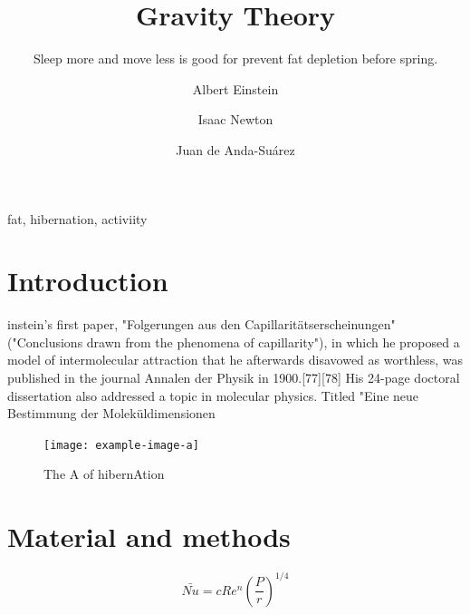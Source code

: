 \documentclass{SFEE}
\begin{document}
\twocolumn

\title{Gravity Theory}
\subtitle{Sleep more and move less is good for prevent fat depletion before   spring.}
\author[1,*]{Albert Einstein }
\author[2]{Isaac Newton}
\author[3]{Juan de Anda-Suárez }
\maketitle
\begin{abstract}
    \lipsum[5]
\end{abstract}
\begin{keywords}
    fat, hibernation, activiity
\end{keywords}

\section{Introduction}

instein's first paper, "Folgerungen aus den Capillaritätserscheinungen" ("Conclusions drawn from the phenomena of capillarity"), in which he proposed a model of intermolecular attraction that he afterwards disavowed as worthless, was published in the journal Annalen der Physik in 1900.[77][78] His 24-page doctoral dissertation also addressed a topic in molecular physics. Titled "Eine neue Bestimmung der Moleküldimensionen \cite{1908JRE.....4..411E}

\begin{figure}[b!]
\texttt{[image: example-image-a]}
\caption{The A of hibernAtion}
\end{figure}
\lipsum[10-13]
\section{Material and methods}
\lipsum[14-17]
\begin{equation}
 \bar{Nu}=cRe^{n}\left ( \frac{P}{r} \right )^{1/4}
\end{equation}
\end{document}
